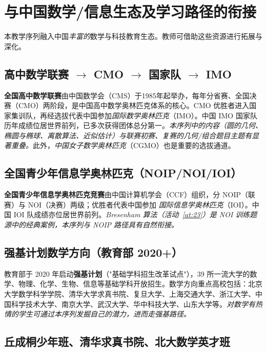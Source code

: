 \documentclass[12pt,a4paper]{scrartcl}
\newcommand{\acc}[1]{\textcolor{accent}{\textbf{#1}}}
\begin{document}
\section{与中国数学/信息生态及学习路径的衔接}\label{sec:obmep}

本教学序列融入中国\emph{丰富的}数学与科技教育生态。教师可借助这些资源进行拓展与深化。

\subsection{高中数学联赛 $\to$ CMO $\to$ 国家队 $\to$ IMO}

\acc{全国高中数学联赛}由中国数学会（CMS）于1985年起举办，每年分省赛、全国决赛（CMO）两阶段，是中国高中数学奥林匹克体系的核心。CMO 优胜者进入国家集训队，再经选拔代表中国参加\emph{国际数学奥林匹克}（IMO）。中国 IMO 国家队历年成绩位居世界前列，已多次获得团体总分第一。\emph{本序列中的内容（圆的几何、椭圆与椭球、离散算法、近似估计）与联赛初赛、复赛的几何/组合题目主题有显著重叠。}此外，\emph{中国女子数学奥林匹克}（CGMO）也是重要的选拔通道。

\subsection{全国青少年信息学奥林匹克（NOIP/NOI/IOI）}

\acc{全国青少年信息学奥林匹克竞赛}由中国计算机学会（CCF）组织，分 NOIP（联赛）与 NOI（决赛）两级；优胜者代表中国参加 \emph{国际信息学奥林匹克}（IOI）。中国 IOI 队成绩亦位居世界前列。\emph{Bresenham 算法（活动~\ref{at:23}）是 NOI 训练题源中的经典案例，本序列与 NOIP 路径具有自然衔接。}

\subsection{强基计划数学方向（教育部 2020+）}

教育部于 2020 年启动\acc{强基计划}（"基础学科招生改革试点"），39 所一流大学的数学、物理、化学、生物、信息等基础学科开放招生。数学方向重点高校包括：北京大学数学科学学院、清华大学求真书院、复旦大学、上海交通大学、浙江大学、中国科学技术大学、南京大学、武汉大学、华中科技大学、山东大学等。\emph{对数学有热情的学生可通过本序列发掘自己的潜力，进而走强基路径。}

\subsection{丘成桐少年班、清华求真书院、北大数学英才班}
\end{document}
